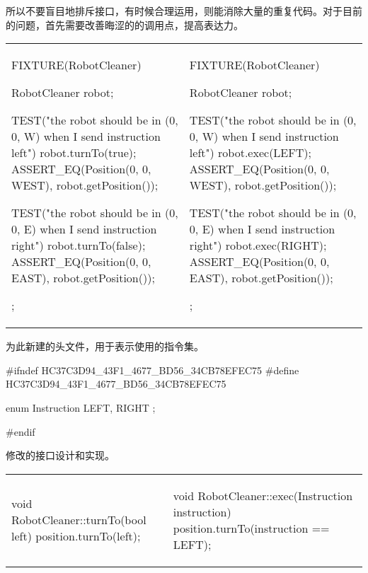 \begin{content}
所以不要盲目地排斥接口，有时候合理运用，则能消除大量的重复代码。对于目前的问题，首先需要改善晦涩的的调用点，提高表达力。

\begin{tabular}{@{}p{} 
                 | p{}@{}}
\begin{c++}[caption={test/robot-cleaner/TestRobotCleaner.h}]
FIXTURE(RobotCleaner)
{
    RobotCleaner robot;

    TEST("the robot should be in (0, 0, W) when I send instruction left")
    {
        robot.turnTo(true);
        ASSERT_EQ(Position(0, 0, WEST), robot.getPosition());
    }

    TEST("the robot should be in (0, 0, E) when I send instruction right")
    {
        robot.turnTo(false);
        ASSERT_EQ(Position(0, 0, EAST), robot.getPosition());
    }
};
\end{c++}
&                 
\begin{c++}[caption={test/robot-cleaner/TestRobotCleaner.h}]
FIXTURE(RobotCleaner)
{
    RobotCleaner robot;

    TEST("the robot should be in (0, 0, W) when I send instruction left")
    {
        robot.exec(LEFT);
        ASSERT_EQ(Position(0, 0, WEST), robot.getPosition());
    }

    TEST("the robot should be in (0, 0, E) when I send instruction right")
    {
        robot.exec(RIGHT);
        ASSERT_EQ(Position(0, 0, EAST), robot.getPosition());
    }
};
\end{c++}
\end{tabular}

为此新建的头文件，用于表示使用的指令集。

\begin{leftbar}
\begin{c++}[caption={include/robot-cleaner/Instruction.h}]
#ifndef HC37C3D94_43F1_4677_BD56_34CB78EFEC75
#define HC37C3D94_43F1_4677_BD56_34CB78EFEC75

enum Instruction { LEFT, RIGHT };

#endif
\end{c++}
\end{leftbar}

修改的接口设计和实现。

\begin{tabular}{@{}p{} 
                 | p{}@{}}
\begin{c++}[caption={include/robot-cleaner/RobotCleaner.h}]
void RobotCleaner::turnTo(bool left)
{
    position.turnTo(left);
}
\end{c++}
&                 
\begin{c++}[caption={include/robot-cleaner/RobotCleaner.h}]
void RobotCleaner::exec(Instruction instruction)
{
    position.turnTo(instruction == LEFT);
}
\end{c++}
\end{tabular}


\end{content}

